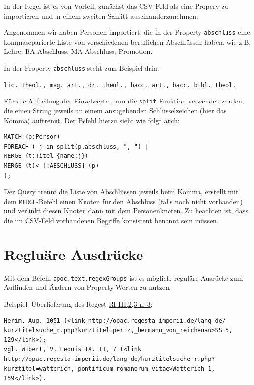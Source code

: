 \documentclass[ngerman,]{scrreprt}
\begin{document}
In der Regel ist es von Vorteil, zunächst das CSV-Feld als eine Propery zu importieren und in einem zweiten Schritt auseinanderzunehmen.

Angenommen wir haben Personen importiert, die in der Property \texttt{abschluss} eine kommaseparierte Liste von verschiedenen beruflichen Abschlüssen haben, wie z.B. Lehre, BA-Abschluss, MA-Abschluss, Promotion.

In der Property \texttt{abschluss} steht zum Beispiel drin:

\texttt{lic.\ theol.,\ mag.\ art.,\ dr.\ theol.,\ bacc.\ art.,\ bacc.\ bibl.\ theol.}

Für die Aufteilung der Einzelwerte kann die \texttt{split}-Funktion verwendet werden, die einen String jeweils an einem anzugebenden Schlüsselzeichen (hier das Komma) auftrennt. Der Befehl hierzu sieht wie folgt auch:

\begin{verbatim}
MATCH (p:Person)
FOREACH ( j in split(p.abschluss, ", ") |
MERGE (t:Titel {name:j})
MERGE (t)<-[:ABSCHLUSS]-(p)
);
\end{verbatim}

Der Query trennt die Liste von Abschlüssen jeweils beim Komma, erstellt mit dem \texttt{MERGE}-Befehl einen Knoten für den Abschluss (falls noch nicht vorhanden) und verlinkt diesen Knoten dann mit dem Personenknoten. Zu beachten ist, dass die im CSV-Feld vorhandenen Begriffe konsistent benannt sein müssen.

\section{Regluäre Ausdrücke}\label{regluuxe4re-ausdruxfccke}

Mit dem Befehl \texttt{apoc.text.regexGroups} ist es möglich, reguläre Ausrücke zum Auffinden und Ändern von Property-Werten zu nutzen.

Beispiel: Überlieferung des Regest \href{http://www.regesta-imperii.de/id/1051-02-02_1_0_3_2_3_3_3}{RI III,2,3 n. 3}:

\begin{verbatim}
Herim. Aug. 1051 (<link http://opac.regesta-imperii.de/lang_de/
kurztitelsuche_r.php?kurztitel=pertz,_hermann_von_reichenau>SS 5, 129</link>);
vgl. Wibert, V. Leonis IX. II, 7 (<link
http://opac.regesta-imperii.de/lang_de/kurztitelsuche_r.php? 
kurztitel=watterich,_pontificum_romanorum_vitae>Watterich 1, 159</link>).
\end{verbatim}
\end{document}
